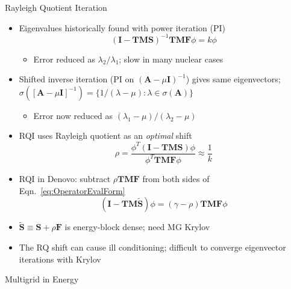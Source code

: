 \documentclass[final]{beamer}
\newcommand{\ve}[1]{\ensuremath{\mathbf{#1}}}
\begin{document}
\begin{frame}{}
\begin{columns}[t]
    \begin{column}{.3\linewidth}
    \begin{block}{Rayleigh Quotient Iteration \cite{Slaybaugh2012}}
	\begin{itemize}
	\item{Eigenvalues historically found with power iteration (PI)}
	\begin{equation}
	(\ve{I} - \ve{TMS})^{-1} \ve{TMF} \phi = k\phi
	\end{equation}
	\vspace*{-1em}
		\begin{itemize}
		\item{Error reduced as $\lambda_{2}/\lambda_{1}$; slow in many nuclear cases}
		\end{itemize}
		\vspace*{0.2 em}
	\item{Shifted inverse iteration (PI on $(\ve{A} - \mu \ve{I})^{-1}$) gives same eigenvectors; $\sigma([\ve{A} - \mu \ve{I}]^{-1}) = \{1/(\lambda - \mu):\lambda \in \sigma(\ve{A})\}$ }
		\vspace*{0.1 em}
		\begin{itemize}
		\item{Error now reduced as $(\lambda_{1}-\mu)/(\lambda_{2}-\mu)$}
		\end{itemize}		
		\vspace*{0.1 em}
	\item{RQI uses Rayleigh quotient as an \textit{optimal} shift}
		\begin{equation}
          \rho = \frac{\phi^T (\ve{I} - \ve{TMS})\phi}{\phi^T \ve{TMF} \phi} \approx \frac{1}{k}
		\end{equation}
		\item{RQI in Denovo: subtract $\rho \ve{TMF}$ from both sides of 
		 Eqn.\ \eqref{eq:OperatorEvalForm}}
        \begin{equation}
          (\ve{I} - \ve{TM}\ve{\tilde{S}})\phi =( \gamma - \rho) \ve{TMF} \phi 
          \label{eq:OperatorShiftedEval} 
        \end{equation}
		\item{$\ve{\tilde{S}} \equiv \ve{S} + \rho\ve{F}$ is energy-block dense;
		 need MG Krylov}
		\item{The RQ shift can cause ill conditioning; difficult to converge
		 eigenvector iterations with Krylov}
	\end{itemize}
            \end{block}
		\vfill
        	\begin{block}{\large Multigrid in Energy \cite{Slaybaugh2013}}

\end{block}
\end{column}
\end{columns}
\end{frame}
\end{document}

